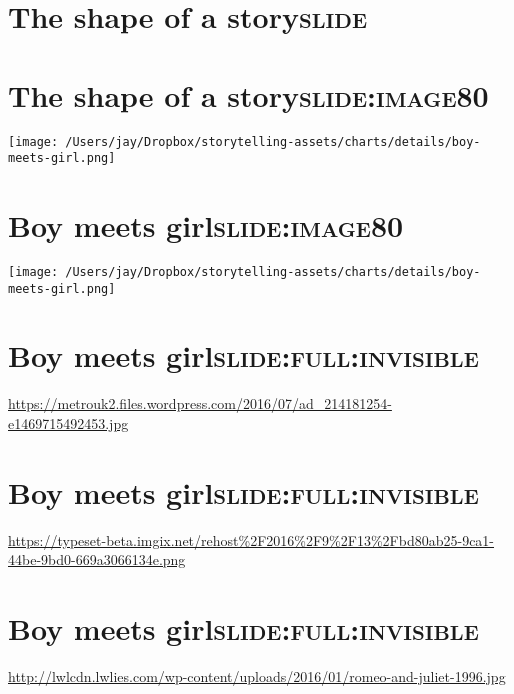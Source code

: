 \documentclass[12pt]{article}
\begin{document}
\section[The \textbf{shape} of a \textbf{story}]{The \textbf{shape} of a \textbf{story}\hfill{}\textsc{slide}}
\label{sec:orgf173fd7}
\section[The \textbf{shape} of a \textbf{story}]{The \textbf{shape} of a \textbf{story}\hfill{}\textsc{slide:image80}}
\label{sec:org18137f0}
\begin{center}
\texttt{[image: /Users/jay/Dropbox/storytelling-assets/charts/details/boy-meets-girl.png]}
\end{center}

\section[Boy meets girl]{Boy meets girl\hfill{}\textsc{slide:image80}}
\label{sec:orgcdb5b84}
\begin{center}
\texttt{[image: /Users/jay/Dropbox/storytelling-assets/charts/details/boy-meets-girl.png]}
\end{center}

\section[Boy meets girl]{Boy meets girl\hfill{}\textsc{slide:full:invisible}}
\label{sec:orga571b3a}
\url{https://metrouk2.files.wordpress.com/2016/07/ad\_214181254-e1469715492453.jpg}

\section[Boy meets girl]{Boy meets girl\hfill{}\textsc{slide:full:invisible}}
\label{sec:org72fd23e}
\url{https://typeset-beta.imgix.net/rehost\%2F2016\%2F9\%2F13\%2Fbd80ab25-9ca1-44be-9bd0-669a3066134e.png}

\section[Boy meets girl]{Boy meets girl\hfill{}\textsc{slide:full:invisible}}
\label{sec:org0cccc5f}
\url{http://lwlcdn.lwlies.com/wp-content/uploads/2016/01/romeo-and-juliet-1996.jpg}
\end{document}

